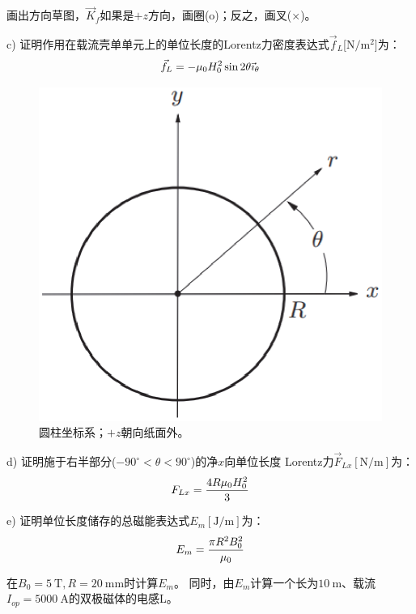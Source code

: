 画出方向草图，$\vec{K}_f$如果是$+z$方向，画圈(o)；反之，画叉(×)。

c) 证明作用在载流壳单单元上的单位长度的Lorentz力密度表达式$\vec{f}_L$[$\mathrm{N/m^2}$]为：
\begin{equation}
\vec{f}_{L}=-\mu_{0}H_{0}^{2}\sin 2\theta\vec{\imath}_{\theta}\\%
\end{equation}

\begin{figure}[htbp]
	\centering
	\includegraphics[scale=0.6]{chpt3/figs/fig3.32.eps}
	\caption{圆柱坐标系；$+z$朝向纸面外。}
\end{figure}

d) 证明施于右半部分($−90^\circ<\theta<90^\circ$)的净$x$向单位长度
Lorentz力$\vec{F}_{Lx}[\mathrm{N/m}]$为：
\begin{equation}
F_{Lx}=\frac{4R\mu_{0}H_{0}^{2}}{3}\\%
\end{equation}

e) 证明单位长度储存的总磁能表达式$E_m[\mathrm{J/m}]$为：
\begin{equation}
E_{m}=\frac{\pi R^{2}B_{0}^{2}}{\mu_{0}}\\%
\end{equation}

在$B_0=5\ \mathrm{T},R=20\ \mathrm{mm}$时计算$E_m$。
同时，由$E_m$计算一个长为$10\ \mathrm{m}$、载流$I_{op}=5000\ \mathrm{A}$的双极磁体的电感L。

